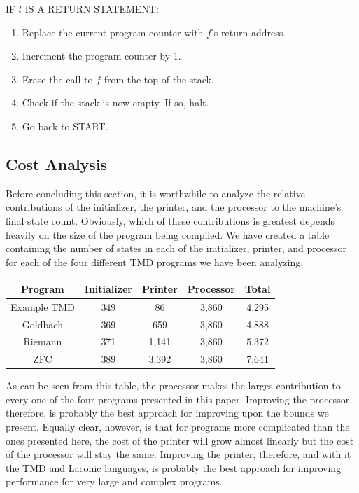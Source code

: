 \documentclass[11pt]{article}
\begin{document}
IF $l$ IS A RETURN STATEMENT:
\begin{enumerate}
\item Replace the current program counter with $f$'s return address.
\item Increment the program counter by 1.
\item Erase the call to $f$ from the top of the stack.
\item Check if the stack is now empty. If so, halt.
\item Go back to START.
\end{enumerate}

\subsection{Cost Analysis}

Before concluding this section, it is worthwhile to analyze the relative contributions of the initializer, the printer, and the processor to the machine's final state count. Obviously, which of these contributions is greatest depends heavily on the size of the program being compiled. We have created a table containing the number of states in each of the initializer, printer, and processor for each of the four different TMD programs we have been analyzing. 

\begin{center}
    \begin{tabular}{||c c c c c||}
    \hline
    Program & Initializer & Printer & Processor & Total \\ [0.5ex]
    \hline\hline
    Example TMD & 349 & 86 & 3,860 & 4,295 \\
    \hline
    Goldbach & 369 & 659 & 3,860 & 4,888 \\
    \hline
    Riemann & 371 & 1,141 & 3,860 & 5,372 \\
    \hline 
    ZFC & 389 & 3,392 & 3,860 & 7,641 \\
    \hline
    \end{tabular}
\end{center}

As can be seen from this table, the processor makes the larges contribution to every one of the four programs presented in this paper. Improving the processor, therefore, is probably the best approach for improving upon the bounds we present. Equally clear, however, is that for programs more complicated than the ones presented here, the cost of the printer will grow almost linearly but the cost of the processor will stay the same. Improving the printer, therefore, and with it the TMD and Laconic languages, is probably the best approach for improving performance for very large and complex programs.
\end{document}
